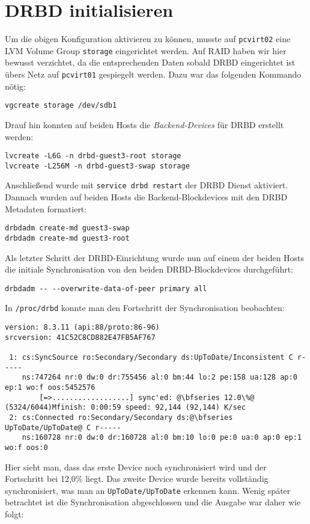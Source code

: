 \section{DRBD initialisieren}
Um die obigen Konfiguration aktivieren zu können, musste auf \verb#pcvirt02# eine LVM Volume Group \verb#storage# eingerichtet werden. Auf RAID haben wir hier bewusst verzichtet, da die entsprechenden Daten sobald DRBD eingerichtet ist übers Netz auf \verb#pcvirt01# gespiegelt werden. Dazu war das folgenden Kommando nötig:
\setupVerbatimOut
\begin{verbatim}
vgcreate storage /dev/sdb1 
\end{verbatim}

Drauf hin konnten auf beiden Hosts die \emph{Backend-Devices} für DRBD erstellt werden:
\setupVerbatimOut
\begin{verbatim}
lvcreate -L6G -n drbd-guest3-root storage
lvcreate -L256M -n drbd-guest3-swap storage
\end{verbatim}

Anschließend wurde mit \texttt{service drbd restart} der DRBD Dienst aktiviert. Dannach wurden auf beiden Hosts die Backend-Blockdevices mit den DRBD Metadaten formatiert:
\setupVerbatimOut
\begin{verbatim}
drbdadm create-md guest3-swap
drbdadm create-md guest3-root
\end{verbatim}

Als letzter Schritt der DRBD-Einrichtung wurde nun auf einem der beiden Hosts die initiale Synchronisation von den beiden DRBD-Blockdevices durchgeführt:

\setupVerbatimOut
\begin{verbatim}
drbdadm -- --overwrite-data-of-peer primary all
\end{verbatim}
In \verb#/proc/drbd# konnte man den Fortschritt der Synchronisation beobachten:
\setupVerbatimOut
\begin{verbatim}
version: 8.3.11 (api:88/proto:86-96)
srcversion: 41C52C8CD882E47FB5AF767 

 1: cs:SyncSource ro:Secondary/Secondary ds:UpToDate/Inconsistent C r-----
    ns:747264 nr:0 dw:0 dr:755456 al:0 bm:44 lo:2 pe:158 ua:128 ap:0 ep:1 wo:f oos:5452576
        [=>..................] sync'ed: @\bfseries 12.0\%@ (5324/6044)Mfinish: 0:00:59 speed: 92,144 (92,144) K/sec
 2: cs:Connected ro:Secondary/Secondary ds:@\bfseries UpToDate/UpToDate@ C r-----
    ns:160728 nr:0 dw:0 dr:160728 al:0 bm:10 lo:0 pe:0 ua:0 ap:0 ep:1 wo:f oos:0
\end{verbatim}
Hier sieht man, dass das erste Device noch synchronisiert wird und der Fortschritt bei 12,0\% liegt. Das zweite Device wurde bereits vollständig synchronisiert, was man an \verb#UpToDate/UpToDate# erkennen kann.
Wenig später betrachtet ist die Synchronisation abgeschlossen und die Ausgabe war daher wie folgt:

